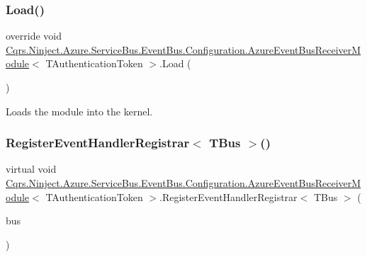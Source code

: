 \subsubsection{\texorpdfstring{Load()}{Load()}}
{\footnotesize\ttfamily override void \hyperlink{classCqrs_1_1Ninject_1_1Azure_1_1ServiceBus_1_1EventBus_1_1Configuration_1_1AzureEventBusReceiverModule}{Cqrs.\+Ninject.\+Azure.\+Service\+Bus.\+Event\+Bus.\+Configuration.\+Azure\+Event\+Bus\+Receiver\+Module}$<$ T\+Authentication\+Token $>$.Load (\begin{DoxyParamCaption}{ }\end{DoxyParamCaption})}



Loads the module into the kernel. 

\mbox{\label{classCqrs_1_1Ninject_1_1Azure_1_1ServiceBus_1_1EventBus_1_1Configuration_1_1AzureEventBusReceiverModule_ab80bf02927363075fc0be6cd180a3398}} 
\subsubsection{\texorpdfstring{Register\+Event\+Handler\+Registrar$<$ T\+Bus $>$()}{RegisterEventHandlerRegistrar< TBus >()}}
{\footnotesize\ttfamily virtual void \hyperlink{classCqrs_1_1Ninject_1_1Azure_1_1ServiceBus_1_1EventBus_1_1Configuration_1_1AzureEventBusReceiverModule}{Cqrs.\+Ninject.\+Azure.\+Service\+Bus.\+Event\+Bus.\+Configuration.\+Azure\+Event\+Bus\+Receiver\+Module}$<$ T\+Authentication\+Token $>$.Register\+Event\+Handler\+Registrar$<$ T\+Bus $>$ (\begin{DoxyParamCaption}\item[{T\+Bus}]{bus }\end{DoxyParamCaption})\hspace{0.3cm}{\ttfamily [virtual]}}



